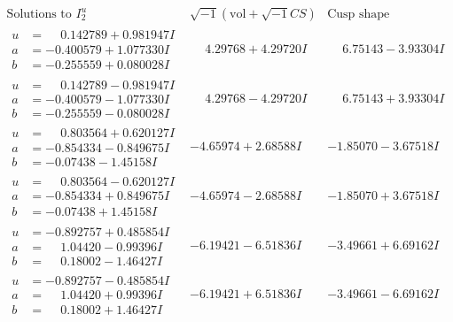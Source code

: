 \documentclass[1p]{elsarticle_modified}
\theoremstyle{definition}
\newcommand{\I}{\sqrt{-1}}
\begin{document}
$$\begin{array}{c|c|c}  
\text{Solutions to }I^u_{2}& \I (\text{vol} + \sqrt{-1}CS) & \text{Cusp shape}\\
 \hline 
\begin{aligned}
u &= \phantom{-}0.142789 + 0.981947 I \\
a &= -0.400579 + 1.077330 I \\
b &= -0.255559 + 0.080028 I\end{aligned}
 & \phantom{-}4.29768 + 4.29720 I & \phantom{-}6.75143 - 3.93304 I \\ \hline\begin{aligned}
u &= \phantom{-}0.142789 - 0.981947 I \\
a &= -0.400579 - 1.077330 I \\
b &= -0.255559 - 0.080028 I\end{aligned}
 & \phantom{-}4.29768 - 4.29720 I & \phantom{-}6.75143 + 3.93304 I \\ \hline\begin{aligned}
u &= \phantom{-}0.803564 + 0.620127 I \\
a &= -0.854334 - 0.849675 I \\
b &= -0.07438 - 1.45158 I\end{aligned}
 & -4.65974 + 2.68588 I & -1.85070 - 3.67518 I \\ \hline\begin{aligned}
u &= \phantom{-}0.803564 - 0.620127 I \\
a &= -0.854334 + 0.849675 I \\
b &= -0.07438 + 1.45158 I\end{aligned}
 & -4.65974 - 2.68588 I & -1.85070 + 3.67518 I \\ \hline\begin{aligned}
u &= -0.892757 + 0.485854 I \\
a &= \phantom{-}1.04420 - 0.99396 I \\
b &= \phantom{-}0.18002 - 1.46427 I\end{aligned}
 & -6.19421 - 6.51836 I & -3.49661 + 6.69162 I \\ \hline\begin{aligned}
u &= -0.892757 - 0.485854 I \\
a &= \phantom{-}1.04420 + 0.99396 I \\
b &= \phantom{-}0.18002 + 1.46427 I\end{aligned}
 & -6.19421 + 6.51836 I & -3.49661 - 6.69162 I \\ \hline\begin{aligned}

\end{aligned}
\end{array}$$
\end{document}
